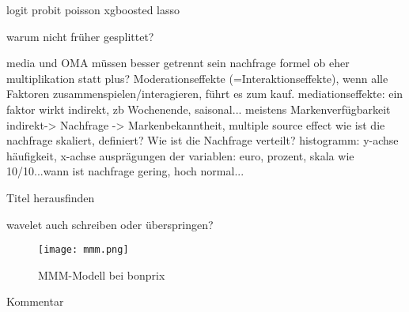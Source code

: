 logit
probit
poisson
xgboosted
lasso

warum nicht früher gesplittet?

media und OMA müssen besser getrennt sein
nachfrage formel ob eher multiplikation statt plus? Moderationseffekte (=Interaktionseffekte), wenn alle Faktoren zusammenspielen/interagieren, führt es zum kauf.
mediationseffekte: ein faktor wirkt indirekt, zb Wochenende, saisonal... meistens Markenverfügbarkeit indirekt-> Nachfrage -> Markenbekanntheit, 
multiple source effect 
wie ist die nachfrage skaliert, definiert? Wie ist die Nachfrage verteilt?
histogramm: y-achse häufigkeit, x-achse ausprägungen der variablen: euro, prozent, skala wie 10/10...wann ist nachfrage gering, hoch normal...

Titel herausfinden

wavelet auch schreiben oder überspringen?


\begin{figure} [h]
    \centering
    \texttt{[image: mmm.png]}
    \caption{\ac{MMM}-Modell bei bonprix}
    \label{fig:enter-label}
\end{figure}


Kommentar 
\fi
